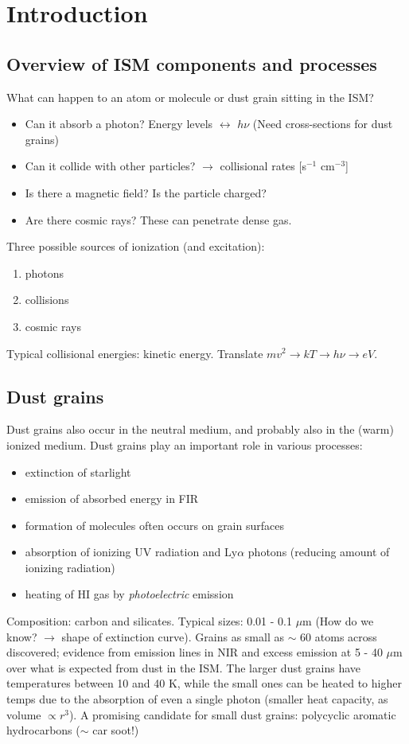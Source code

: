 \documentclass[12pt]{article}
\newcommand{\mar}[1]{\hspace{0pt}\marginpar{-\textcolor{black}{#1}-}}
\let\oldsection\section
\renewcommand\section{\clearpage\oldsection}
\begin{document}
\setlength{\parskip}{0ex}
\tableofcontents\newpage
\setlength{\parskip}{2ex}

\reversemarginpar
\section{Introduction}
\subsection{Overview of ISM components and processes}
\mar{6}What can happen to an atom or molecule or dust
grain sitting in the ISM?
\begin{itemize}
    \item Can it absorb a photon? Energy levels $\leftrightarrow$ $h\nu$
        (Need cross-sections for dust grains)
    \item Can it collide with other particles? $\rightarrow$ collisional
        rates [s$^{-1}$ cm$^{-3}$]
    \item Is there a magnetic field? Is the particle charged?
    \item Are there cosmic rays? These can penetrate dense gas.
\end{itemize}
Three possible sources of ionization (and excitation):
\begin{enumerate}
    \item photons
    \item collisions
    \item cosmic rays
\end{enumerate}
Typical collisional energies: kinetic energy.
Translate $mv^{2} \rightarrow kT \rightarrow h\nu \rightarrow eV$.

\subsection{Dust grains}
\mar{8}Dust grains also occur in the neutral medium, and
probably also in the (warm) ionized medium. Dust grains play an important
role in various processes:
\begin{itemize}
    \item extinction of starlight
    \item emission of absorbed energy in FIR
    \item formation of molecules often occurs on grain surfaces
    \item absorption of ionizing UV radiation and Ly$\alpha$ photons
        (reducing amount of ionizing radiation)
    \item heating of HI gas by \emph{photoelectric} emission
\end{itemize}
Composition: carbon and silicates. Typical sizes: 0.01 - 0.1 $\mu$m
(How do we know? $\rightarrow$ shape of extinction curve). Grains as small
as $\sim$ 60 atoms across discovered; evidence from emission lines in NIR
and excess emission at 5 - 40 $\mu$m over what is expected from dust in the ISM\@.
The larger dust grains have temperatures between 10 and 40 K, while the small
ones can be heated to higher temps due to the absorption of even a single
photon (smaller heat capacity, as volume $\propto r^{3}$). A promising
candidate for small dust grains: polycyclic aromatic hydrocarbons
($\sim$ car soot!)
\end{document}
